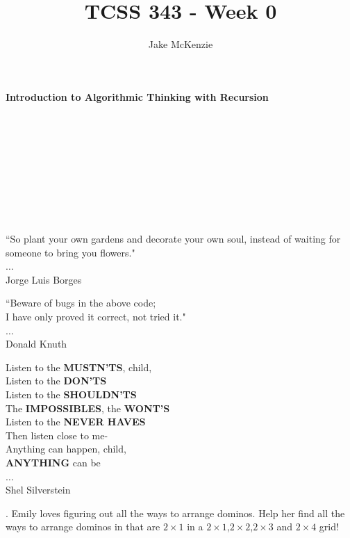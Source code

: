 \documentclass[12pt]{article}
\begin{document}
\title{TCSS 343 - Week 0}
\author{Jake McKenzie}
\maketitle
\noindent\centerline{\textbf{Introduction to Algorithmic Thinking with Recursion}}\\\\\\\\\\\\\\\\
\begin{center}
    ``So plant your own gardens and decorate your own soul, instead of waiting for someone to bring you flowers." \\$\dots$\\ Jorge Luis Borges
\end{center}
\begin{center}
    ``Beware of bugs in the above code; \\I have only proved it correct, not tried it." \\$\dots$\\ Donald Knuth
\end{center}
\begin{center}
Listen to the \textbf{MUSTN'TS}, child,\\
      Listen to the \textbf{DON'TS}\\
      Listen to the \textbf{SHOULDN'TS}\\
The \textbf{IMPOSSIBLES}, the \textbf{WONT'S}\\
      Listen to the \textbf{NEVER HAVES}\\
Then listen close to me-\\
      Anything can happen, child,\\
      \textbf{ANYTHING} can be\\ 
      $\dots$\\
      Shel Silverstein 
\end{center}
    \newpage
{}. Emily loves figuring out all the ways to arrange dominos. Help her find all the ways to arrange dominos in that are $2 \times 1$ in a $2 \times 1$,$2 \times 2$,$2 \times 3$ and $2 \times 4$ grid!\\\\\\\\\\\\\\\\\\\\\\\\
\end{document}

